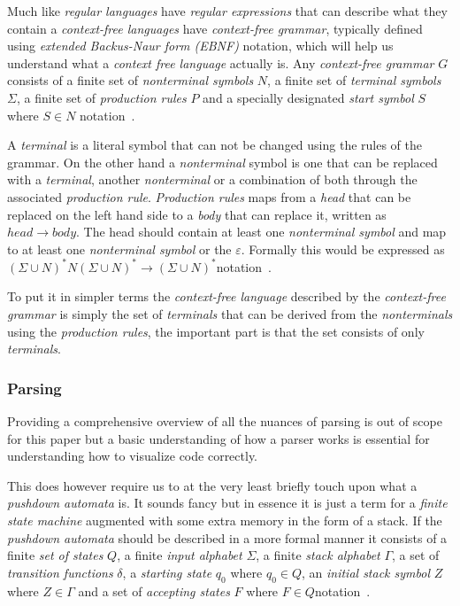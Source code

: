 \documentclass{sigchi}
\begin{document}
Much like \emph{regular languages} have \emph{regular expressions} that can describe what they contain a \emph{context-free languages} have \emph{context-free grammar}, typically defined using \emph{extended Backus-Naur form (EBNF)} notation, which will help us understand what a \emph{context free language} actually is. Any \emph{context-free grammar} $G$ consists of a finite set of \emph{nonterminal symbols} $N$, a finite set of \emph{terminal symbols} $\Sigma$, a finite set of \emph{production rules} $P$ and a specially designated \emph{start symbol} $S$ where $S \in N$ notation~\cite{Kozen:1997}.

A \emph{terminal} is a literal symbol that can not be changed using the rules of the grammar. On the other hand a \emph{nonterminal} symbol is one that can be replaced with a \emph{terminal}, another \emph{nonterminal} or a combination of both through the associated \emph{production rule}. \emph{Production rules} maps from a \emph{head} that can be replaced on the left hand side to a \emph{body} that can replace it, written as $head \to body$. The head should contain at least one \emph{nonterminal symbol} and map to at least one \emph{nonterminal symbol} or the $\varepsilon$. Formally this would be expressed as $(\Sigma \cup N)^* N (\Sigma \cup N)^* \to (\Sigma \cup N)^*$notation~\cite{Kozen:1997}.

To put it in simpler terms the \emph{context-free language} described by the \emph{context-free grammar} is simply the set of \emph{terminals} that can be derived from the \emph{nonterminals} using the \emph{production rules}, the important part is that the set consists of only \emph{terminals}.


\subsubsection{Parsing}
Providing a comprehensive overview of all the nuances of parsing is out of scope for this paper but a basic understanding of how a parser works is essential for understanding how to visualize code correctly.

This does however require us to at the very least briefly touch upon what a \emph{pushdown automata} is. It sounds fancy but in essence it is just a term for a \emph{finite state machine} augmented with some extra memory in the form of a stack. If the \emph{pushdown automata} should be described in a more formal manner it consists of a finite \emph{set of states} $Q$, a finite \emph{input alphabet} $\Sigma$, a finite \emph{stack alphabet} $\Gamma$, a set of \emph{transition functions} $\delta$, a \emph{starting state} $q_{0}$ where $q_{0} \in Q$, an \emph{initial stack symbol} $Z$ where $Z \in \Gamma$ and a set of \emph{accepting states} $F$ where $F \in Q$notation~\cite{Kozen:1997}.
\end{document}
